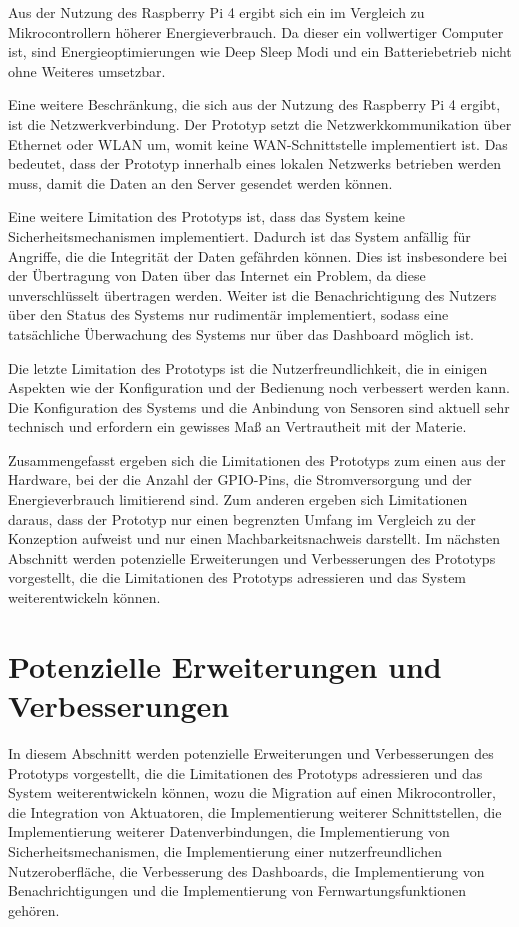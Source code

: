 Aus der Nutzung des Raspberry Pi 4 ergibt sich ein im Vergleich zu Mikrocontrollern höherer Energieverbrauch.
Da dieser ein vollwertiger Computer ist, sind Energieoptimierungen wie Deep Sleep Modi und ein Batteriebetrieb nicht ohne Weiteres umsetzbar.

Eine weitere Beschränkung, die sich aus der Nutzung des Raspberry Pi 4 ergibt, ist die Netzwerkverbindung.
Der Prototyp setzt die Netzwerkkommunikation über Ethernet oder WLAN um, womit keine WAN-Schnittstelle implementiert ist.
Das bedeutet, dass der Prototyp innerhalb eines lokalen Netzwerks betrieben werden muss, damit die Daten an den Server gesendet werden können.

Eine weitere Limitation des Prototyps ist, dass das System keine Sicherheitsmechanismen implementiert.
Dadurch ist das System anfällig für Angriffe, die die Integrität der Daten gefährden können.
Dies ist insbesondere bei der Übertragung von Daten über das Internet ein Problem, da diese unverschlüsselt übertragen werden.
Weiter ist die Benachrichtigung des Nutzers über den Status des Systems nur rudimentär implementiert, sodass eine tatsächliche Überwachung des Systems nur über das Dashboard möglich ist.

Die letzte Limitation des Prototyps ist die Nutzerfreundlichkeit, die in einigen Aspekten wie der Konfiguration und der Bedienung noch verbessert werden kann.
Die Konfiguration des Systems und die Anbindung von Sensoren sind aktuell sehr technisch und erfordern ein gewisses Maß an Vertrautheit mit der Materie.

Zusammengefasst ergeben sich die Limitationen des Prototyps zum einen aus der Hardware, bei der die Anzahl der GPIO-Pins, die Stromversorgung und der Energieverbrauch limitierend sind.
Zum anderen ergeben sich Limitationen daraus, dass der Prototyp nur einen begrenzten Umfang im Vergleich zu der Konzeption aufweist und nur einen Machbarkeitsnachweis darstellt.
Im nächsten Abschnitt werden potenzielle Erweiterungen und Verbesserungen des Prototyps vorgestellt, die die Limitationen des Prototyps adressieren und das System weiterentwickeln können.



\section{Potenzielle Erweiterungen und Verbesserungen}
In diesem Abschnitt werden potenzielle Erweiterungen und Verbesserungen des Prototyps vorgestellt, die die Limitationen des Prototyps adressieren und das System weiterentwickeln können, wozu die Migration auf einen Mikrocontroller, die Integration von Aktuatoren, die Implementierung weiterer Schnittstellen, die Implementierung weiterer Datenverbindungen, die Implementierung von Sicherheitsmechanismen, die Implementierung einer nutzerfreundlichen Nutzeroberfläche, die Verbesserung des Dashboards, die Implementierung von Benachrichtigungen und die Implementierung von Fernwartungsfunktionen gehören.

